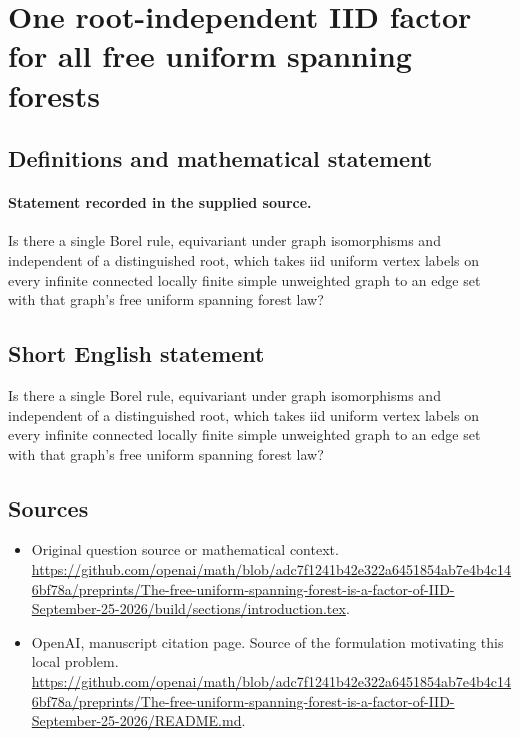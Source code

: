 \documentclass[11pt]{article}
\begin{document}
\section*{One root-independent IID factor for all free uniform spanning forests}\label{statement}
\subsection{Definitions and mathematical statement}
\paragraph{Statement recorded in the supplied source.}
Is there a single Borel rule, equivariant under graph isomorphisms and independent of a distinguished root, which takes iid uniform vertex labels on every infinite connected locally finite simple unweighted graph to an edge set with that graph’s free uniform spanning forest law?
\subsection{Short English statement}
Is there a single Borel rule, equivariant under graph isomorphisms and independent of a distinguished root, which takes iid uniform vertex labels on every infinite connected locally finite simple unweighted graph to an edge set with that graph’s free uniform spanning forest law?
\subsection{Sources}
\begin{itemize}
\item[S1] Original question source or mathematical context.
\url{https://github.com/openai/math/blob/adc7f1241b42e322a6451854ab7e4b4c146bf78a/preprints/The-free-uniform-spanning-forest-is-a-factor-of-IID-September-25-2026/build/sections/introduction.tex}.
\item[S2] OpenAI, manuscript citation page. Source of the formulation motivating this local problem.
\url{https://github.com/openai/math/blob/adc7f1241b42e322a6451854ab7e4b4c146bf78a/preprints/The-free-uniform-spanning-forest-is-a-factor-of-IID-September-25-2026/README.md}.
\end{itemize}
\end{document}
